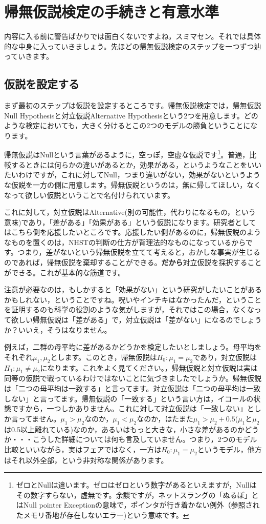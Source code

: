 \documentclass{ltjsbook}
\begin{document}
\section{帰無仮説検定の手続きと有意水準}

内容に入る前に警告ばかりでは面白くないですよね，スミマセン。それでは具体的な中身に入っていきましょう。先ほどの帰無仮説検定のステップを一つずつ辿っていきます。
\subsection{仮説を設定する}
まず最初のステップは仮説を設定するところです。帰無仮説検定では，帰無仮説Null Hypothesisと対立仮説Alternative Hypothesisという2つを用意します。どのような検定においても，大きく分けるとこの2つのモデルの勝負ということになります。

帰無仮説はNullという言葉があるように，空っぽ，空虚な仮説です\footnote{ゼロとNullは違います。ゼロはゼロという数字があるといえますが，Nullはその数字すらない，虚無です。余談ですが，ネットスラングの「ぬるぽ」とはNull pointer Exceptionの意味で，ポインタが行き着かない例外（参照されたメモリ番地が存在しないエラー)という意味です。}。普通，比較するときには何らかの違いがあるとか，効果がある，というようなことをいいたいわけですが，これに対してNull，つまり違いがない，効果がないというような仮説を一方の側に用意します。帰無仮説というのは，無に帰してほしい，なくなって欲しい仮説ということで名付けられています。

これに対して，対立仮説はAlternative(別の可能性，代わりになるもの，という意味)であり，「差がある」「効果がある」という仮説になります。研究者としてはこちら側を応援したいところです。応援したい側があるのに，帰無仮説のようなものを置くのは，NHSTの判断の仕方が背理法的なものになっているからです。つまり，差がないという帰無仮説を立てて考えると，おかしな事実が生じるのであれば，帰無仮説を棄却することができる。\textbf{だから}対立仮説を採択することができる。これが基本的な筋道です。

注意が必要なのは，もしかすると「効果がない」という研究がしたいことがあるかもしれない，ということですね。呪いやインチキはなかったんだ，ということを証明するのも科学の役割のような気がしますが，それではこの場合，なくなって欲しい帰無仮説は「差がある」で，対立仮説は「差がない」になるのでしょうか？いいえ，そうはなりません。

例えば，二群の母平均に差があるかどうかを検定したいとしましょう。母平均をそれぞれ$\mu_1,\mu_2$とします。このとき，帰無仮説は$H_0 : \mu_1 = \mu_2$であり，対立仮説は$H_1:\mu_1 \neq \mu_2$になります。これをよく見てください。，帰無仮説と対立仮説は実は同等の仮説で戦っているわけではないことに気づきましたでしょうか。帰無仮説は「二つの母平均は一致する」と言ってます。対立仮説は「二つの母平均は一致しない」と言ってます。帰無仮説の「一致する」という言い方は，イコールの状態ですから，一つしかありません。これに対して対立仮説は「一致しない」としか言ってません。$\mu_1>\mu_2$なのか，$\mu_1<\mu_2$なのか，はたまた$\mu_1 > \mu_2 + 0.5$($\mu_1$と$\mu_2$は0.5以上離れている)なのか，あるいはもっと大きな，小さな差があるのかどうか・・・こうした詳細については何も言及していません。つまり，2つのモデル比較といいながら，実はフェアではなく，一方は$H_0 : \mu_1 = \mu_2$というモデル，他方はそれ以外全部，という非対称な関係があります。
\end{document}
